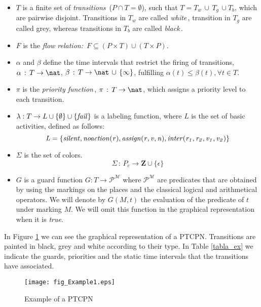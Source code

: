 {\begin{itemize}
We consider as  initial marking $M_0$,  the marking in which the
{\it entry} place is marked with one token, and all the colored
places are marked with $\epsilon$.


\item  $T$ is a finite set of {\em
transitions}\, ($P \cap T = \emptyset$), such that
$T=T_w\,\cup\,T_g\,\cup T_b$, which are pairwise disjoint.
Transitions in $T_w$ are called {\em white}\,, transition in $T_g$
are called grey,  whereas transitions in $T_b$ are called {\em
black}\,.
%
\item $F$ is the {\em flow relation:\,} $F
\subseteq (P \times T) \cup (T \times P)$.
%
\item $\alpha$ and
$\beta$ define the time intervals that restrict
the firing of transitions, $\alpha\,:\, T \rightarrow \nat$,
$\beta\,:\, T \rightarrow \nat\,\cup\,\{\infty\}$, fulfilling
$\alpha(t)\leq
\beta(t), \forall t \in T$. 
%
\item $\pi$ is the {\em priority
function\,},\; $\pi\,:\,T \rightarrow \nat$, which assigns a
priority level to each transition.
%
\item $\lambda: T \rightarrow L \cup \{\emptyset\} \cup \{{\it fail}\}$ is a
labeling function, where $L$ is the set of basic activities,
defined as follows: $$ {\it L=\{silent, noaction(r), assign(r,v,n),
inter(r_1,r_2,v_1,v_2)\}}$$
%
\item $\Sigma$ is the set of colors.
\[ \Sigma \, : \, P_c \rightarrow \mathbf{Z} \cup \{ \epsilon \} \]
%
\item $G$ is a guard function $G: T \rightarrow \mathcal{P^M}$ where $\mathcal{P^M}$ are predicates that are obtained by using the markings on the places and the classical logical and arithmetical operators.  We will denote by $G(M,t)$ the evaluation of the predicate of $t$ under marking $M$. We will omit this function in the graphical representation when it is {\it true}.
\end{itemize}
%
\edfn

\bex \label{ex1} In Figure \ref{example1} we can see the graphical
representation of a PTCPN. Transitions are painted in black, grey
and white according to their type. In Table \ref{tabla_ex} we
indicate the guards, priorities and the static time intervals that
the transitions  have associated.  \eex

\begin{figure}[!h]
%
\begin{center}
\texttt{[image: fig\_Example1.eps]}
\end{center}
\caption{ Example of a PTCPN} \label{example1}
\end{figure}

}
